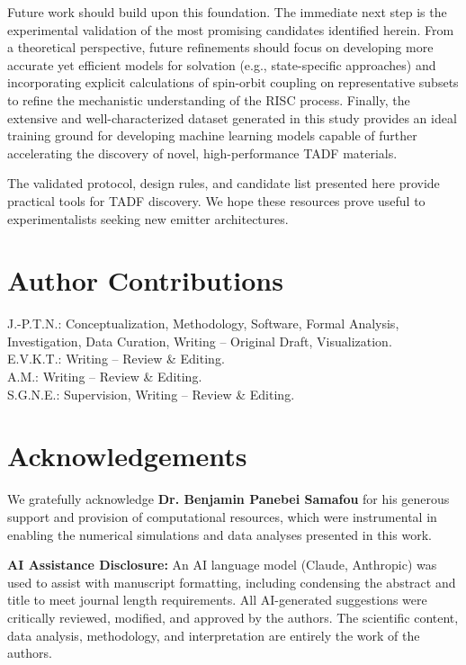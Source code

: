 \documentclass[journal=jcisd8,manuscript=article,keywords=true]{achemso}
\begin{document}
Future work should build upon this foundation. The immediate next step is the experimental validation of the most promising candidates identified herein. From a theoretical perspective, future refinements should focus on developing more accurate yet efficient models for solvation (e.g., state-specific approaches) and incorporating explicit calculations of spin-orbit coupling on representative subsets to refine the mechanistic understanding of the RISC process. Finally, the extensive and well-characterized dataset generated in this study provides an ideal training ground for developing machine learning models capable of further accelerating the discovery of novel, high-performance TADF materials.

The validated protocol, design rules, and candidate list presented here provide practical tools for TADF discovery. We hope these resources prove useful to experimentalists seeking new emitter architectures.

\section*{Author Contributions}
J.-P.T.N.: Conceptualization, Methodology, Software, Formal Analysis, 
Investigation, Data Curation, Writing – Original Draft, Visualization.\\ 
E.V.K.T.: Writing – Review \& Editing. \\
A.M.:  Writing – Review \& Editing. \\
S.G.N.E.: Supervision, Writing – Review \& Editing.

\section*{Acknowledgements}

We gratefully acknowledge \textbf{Dr. Benjamin Panebei Samafou} for his generous support
and provision of computational resources, which were instrumental in enabling the
numerical simulations and data analyses presented in this work.

\textbf{AI Assistance Disclosure:} An AI language model (Claude, Anthropic) was used
to assist with manuscript formatting, including condensing the abstract and title
to meet journal length requirements. All AI-generated suggestions were critically
reviewed, modified, and approved by the authors. The scientific content, data
analysis, methodology, and interpretation are entirely the work of the authors.
\end{document}
